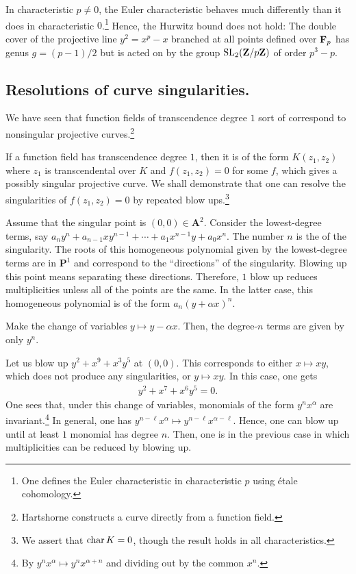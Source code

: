 \documentclass [11 pt, oneside] {article}
\begin{document}
\begin{remark}
	In characteristic $p\ne 0$, the Euler characteristic behaves much differently than it does in characteristic $0$.\footnote{One defines the Euler characteristic in characteristic $p$ using \'etale cohomology.} Hence, the Hurwitz bound does not hold: The double cover of the projective line $y^2=x^p-x$ branched at all points defined over $\mathbf F_p$ has genus $g = (p-1)/2$ but is acted on by the group $\operatorname{SL}_{2}(\mathbf Z/p\mathbf Z)$ of order $p^3-p$.
\end{remark}

\subsection{Resolutions of curve singularities.}
We have seen that function fields of transcendence degree $1$ sort of correspond to nonsingular projective curves.\footnote{Hartshorne constructs a curve directly from a function field.} 

If a function field has transcendence degree $1$, then it is of the form $K(z_1,z_2)$ where $z_1$ is transcendental over $K$ and $f(z_1,z_2)=0$ for some $f$, which gives a possibly singular projective curve. We shall demonstrate that one can resolve the singularities of $f(z_1,z_2)=0$ by repeated blow ups.\footnote{We assert that $\operatorname{char} K =0$, though the result holds in all characteristics.}

Assume that the singular point is $(0,0)\in  \mathbf{A}^2$. Consider the lowest-degree terms, say $a_ny^n + a_{n-1}xy^{n-1} + \cdots + a_1 x^{n-1}y + a_0 x^n$. The number $n$ is the  of the singularity. The roots of this homogeneous polynomial given by the lowest-degree terms are in $\mathbf{P}^1$ and correspond to the ``directions'' of the singularity. Blowing up this point means separating these directions. Therefore, $1$ blow up reduces multiplicities unless all of the points are the same. In the latter case, this homogeneous polynomial is of the form $a_n(y+\alpha x)^n$.

Make the change of variables $y\longmapsto y-\alpha x$. Then, the degree-$n$ terms are given by only $y^n$.

\begin{example}[ ]\label{}\text{}
Let us blow up $y^2+x^9 + x^3y^5$ at $(0,0)$. This corresponds to either $x\longmapsto xy$, which does not produce any singularities, or $y\longmapsto xy$. In this case, one gets
\begin{align*}
	y^2 + x^7 + x^6y^5=0.
\end{align*}
One sees that, under this change of variables, monomials of the form $y^nx^\alpha$ are invariant.\footnote{By $y^nx^\alpha\longmapsto y^nx^{\alpha+n}$ and dividing out by the common $x^n$.} In general, one has $y^{n-\ell}x^\alpha \longmapsto y^{n-\ell}x^{\alpha-\ell}$. Hence, one can blow up until at least $1$ monomial has degree $n$. Then, one is in the previous case in which multiplicities can be reduced by blowing up.
\end{example}
\end{document}
